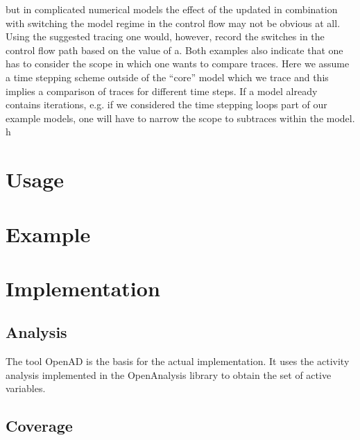 \documentclass{article}
\begin{document}
but in complicated numerical models the effect of the updated in combination with 
switching the model regime in the control flow may not be obvious at all. 
Using the suggested tracing one would, however, record the switches in 
the control flow path based on the value of a. 
Both examples also indicate that one has to consider the  scope in which 
one wants to compare traces. Here we assume a time stepping scheme 
outside of the ``core'' model which we trace and this implies a comparison 
of traces for different time steps.  
If a model already contains iterations, e.g. if we considered the time stepping 
loops part of our example models, one will have to narrow the scope to 
subtraces within the model. 
h
\section{Usage}

\section{Example}

\section{Implementation}\label{sec:analysis}
\subsection{Analysis}\label{sec:analysis}
  
      


 
The tool OpenAD \cite{OpenAD} is the basis for the actual implementation. 
It uses the activity analysis implemented in the OpenAnalysis \cite{OpenAnalysis} library 
to obtain the set of active variables. 

 



      
\subsection{Coverage}
\end{document}
